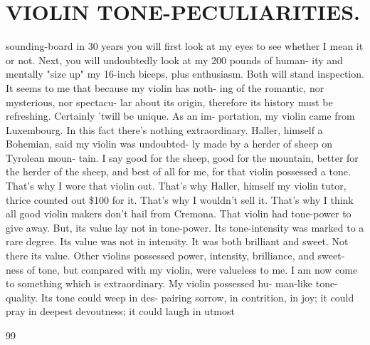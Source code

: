 \documentclass{article}
\begin{document}
\section*{VIOLIN TONE-PECULIARITIES.}
sounding-board in 30 years you will first look at my eyes to see whether I mean it or not. Next, you will undoubtedly look at my 200 pounds of human- ity and mentally "size up" my 16-inch biceps, plus enthusiasm. Both will stand inspection. It seems to me that because my violin has noth- ing of the romantic, nor mysterious, nor spectacu- lar about its origin, therefore its history must be refreshing. Certainly 'twill be unique. As an im- portation, my violin came from Luxembourg. In this fact there's nothing extraordinary. Haller, himself a Bohemian, said my violin was undoubted- ly made by a herder of sheep on Tyrolean moun- tain. I say good for the sheep, good for the mountain, better for the herder of the sheep, and best of all for me, for that violin possessed a tone. That's why I wore that violin out. That's why Haller, himself my violin tutor, thrice counted out \$100 for it. That's why I wouldn't sell it. That's why I think all good violin makers don't hail from Cremona. That violin had tone-power to give away. But, its value lay not in tone-power. Its tone-intensity was marked to a rare degree. Its value was not in intensity. It was both brilliant and sweet. Not there its value. Other violins possessed power, intensity, brilliance, and sweet- ness of tone, but compared with my violin, were valueless to me. I am now come to something which is extraordinary. My violin possessed hu- man-like tone-quality. Its tone could weep in des- pairing sorrow, in contrition, in joy; it could pray in deepest devoutness; it could laugh in utmost

99
\end{document}

